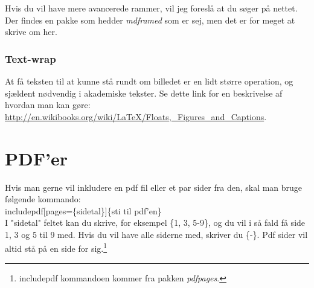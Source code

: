 \noindent
Hvis du vil have mere avancerede rammer, vil jeg foreslå at du søger på nettet. Der findes en pakke som hedder \emph{mdframed} som er sej, men det er for meget at skrive om her.

\subsubsection{Text-wrap}
At få teksten til at kunne stå rundt om billedet er en lidt større operation, og sjældent nødvendig i akademiske tekster. Se dette link for en beskrivelse af hvordan man kan gøre: \url{http://en.wikibooks.org/wiki/LaTeX/Floats,_Figures_and_Captions}.

\section{PDF'er}
Hvis man gerne vil inkludere en pdf fil eller et par sider fra den, skal man bruge følgende kommando:\\

\indent \bs includepdf[pages=\{sidetal\}]\{sti til pdf'en\}\\

\noindent
I "sidetal" feltet kan du skrive, for eksempel \{1, 3, 5-9\}, og du vil i så fald få side 1, 3 og 5 til 9 med. Hvis du vil have alle siderne med, skriver du \{-\}. Pdf sider vil altid stå på en side for sig.\footnote{\bs includepdf kommandoen kommer fra pakken \emph{pdfpages}.}